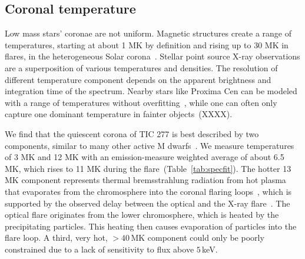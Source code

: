 \documentclass[twocolumn]{aastex631}
\begin{document}
\subsection{Coronal temperature}
\label{sec:discussion:xraytemp}
Low mass stars' coronae are not uniform. Magnetic structures create a range of temperatures, starting at about 1 MK by definition and rising up to 30 MK in flares, in the heterogeneous Solar corona~\citep{vaiana1978recent}. Stellar point source X-ray observations are a superposition of various temperatures and densities. The resolution of different temperature component depends on the apparent brightness and integration time of the spectrum. Nearby stars like Proxima Cen can be modeled with a range of temperatures without overfitting~\citep[e.g.,][]{gudel2004flares}, while one can often only capture one dominant temperature in fainter objects~(XXXX).  

We find that the quiescent corona of TIC 277 is best described by two components, similar to many other active M dwarfs~\citep{wargelin2008xray, robrade2010quiescent, behr2023muscles, magaudda2022firsta}. We measure temperatures of 3 MK and 12 MK with an emission-measure weighted average of about 6.5 MK, which rises to 11 MK during the flare~(Table~\ref{tab:specfit}). The hotter 13 MK component represents thermal bremsstrahlung radiation from hot plasma that evaporates from the chromosphere into the coronal flaring loops~\citep{benz2016flare}, which is supported by the observed delay between the optical and the X-ray flare~\citep{hawley2003multiwavelength}. The optical flare originates from the lower chromosphere, which is heated by the precipitating particles. This heating then causes evaporation of particles into the flare loop. A third, very hot, $>40\,$MK component could only be poorly constrained due to a lack of sensitivity to flux above $5\,$keV.
\end{document}
